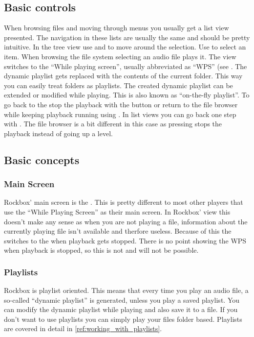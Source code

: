 \subsection{Basic controls}
When browsing files and moving through menus you usually get a list view
presented. The navigation in these lists are usually the same and should be
pretty intuitive.
In the tree view use \ActionStdNext{} and \ActionStdPrev{} to move around
the selection. Use \ActionStdOk{} to select an item. When browsing the file
system selecting an audio file plays it. The view switches to the ``While
playing screen'', usually abbreviated as ``WPS'' (see . The
dynamic playlist gets replaced with the contents of the current folder. This
way you can easily treat folders as playlists. The created dynamic playlist can
be extended or modified while playing. This is also known as
``on-the-fly playlist''.
To go back to the  stop the playback with the
\ActionWpsStop{} button or return to the file browser while keeping playback
running using \ActionWpsBrowse{}.
In list views you can go back one step with \ActionStdCancel{}. The file
browser is a bit different in this case as pressing \ActionWpsStop{}
stops the playback instead of going up a level.

\subsection{Basic concepts}
\subsubsection{Main Screen}
Rockbox' main screen is the . This is pretty different to
most other players that use the ``While Playing Screen'' as their main screen.
In Rockbox' view this doesn't make any sense as when you are not playing a
file, information about the currently playing file isn't available and therfore
useless. Because of this the \dap{} switches to the  when
playback gets stopped. There is no point showing the WPS when playback is
stopped, so this is not and will not be possible.

\subsubsection{Playlists}
Rockbox is playlist oriented. This means that every time you play an audio file,
a so-called ``dynamic playlist'' is generated,  unless you play a saved
playlist. You can modify the dynamic playlist while playing and also save
it to a file. If you don't want to use playlists you can simply play your
files folder based.
Playlists are covered in detail in \ref{ref:working_with_playlists}.

